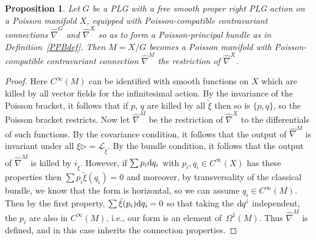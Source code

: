 \documentclass[pdftex]{sigma}
\numberwithin{equation}{section}
\newtheorem{Proposition}[Theorem]{Proposition}
 { \theoremstyle{definition}
\newtheorem{Definition}[Theorem]{Definition}
\newtheorem{Example}[Theorem]{Example}
\newtheorem{Remark}[Theorem]{Remark} }
\newcommand{\<}{{\langle}}
\renewcommand{\>}{{\rangle}}
\newcommand{\CL}{{\mathcal{L}}}
\newcommand{\extd}{{\rm d}}
\newcommand{\la}{{\triangleright}}
\begin{document}
\begin{Proposition}\label{basecalc} Let $G$ be a PLG with a free smooth proper right PLG action on a Poisson manifold $X$, equipped with Poisson-compatible contravariant connections $\hat\nabla^G$ and $\hat\nabla^X$ so as to form a Poisson-principal bundle as in Definition~{\rm \ref{PPBdef}}. Then $M=X/G$ becomes a Poisson manifold with Poisson-compatible contravariant connection $\hat\nabla^M$ the restriction of $\hat\nabla^X$.
\end{Proposition}
\begin{proof} Here $C^\infty(M)$ can be identified with smooth functions on $X$ which are killed by all vector fields for the infinitesimal action. By the invariance of the Poisson bracket, it follows that if $p$, $q$ are killed by all $\tilde\xi$ then so is $\{p,q\}$, so the Poisson bracket restricts. Now let $\hat\nabla^M$ be the restriction of $\hat\nabla^X$ to the differentials of such functions. By the covariance condition, it follows that the output of $\hat\nabla^M$ is invariant under all $\xi\la=\CL_{\tilde\xi}$. By the bundle condition, it follows that the output of $\hat\nabla^M$ is killed by $i_{\tilde\xi}$. However, if $\sum p_i\extd q_i$ with $p_i,q_i\in C^\infty(X)$ has these properties then $\sum p_i\tilde{\xi}(q_i)=0$ and moreover, by transversality of the classical bundle, we know that the form is horizontal, so we can assume $q_i\in C^\infty(M)$. Then by the first property, $\sum\tilde\xi(p_i)\extd q_i=0$ so that taking the $\extd q^i$ independent, the $p_i$ are also in $C^\infty(M)$, i.e., our form is an element of~$\Omega^1(M)$. Thus $\hat\nabla^M$ is defined, and in this case inherits the connection properties. \end{proof}
\end{document}
